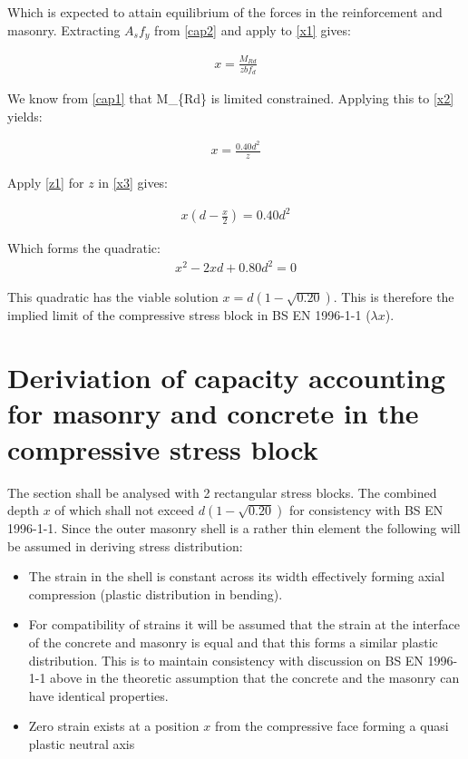 \documentclass[11pt]{article}
\providecommand{\tightlist}{%
      \setlength{\itemsep}{0pt}\setlength{\parskip}{0pt}}
\begin{document}
Which is expected to attain equilibrium of the forces in the
reinforcement and masonry. Extracting \(A_s f_y\) from \ref{cap2} and
apply to \ref{x1} gives:

\begin{align}
   x = \frac{M_{Rd}}{z b f_d}
   \end{align}

We know from \ref{cap1} that M\_\{Rd\} is limited constrained. Applying
this to \ref{x2} yields:

\begin{align}
x = \frac{0.40 d^2}{z}
\end{align}

Apply \ref{z1} for \(z\) in \ref{x3} gives:

\begin{align}
x(d - \frac{x}{2}) = 0.40d^2
\end{align}

Which forms the quadratic: \begin{align}
x^2 - 2 x d + 0.80 d^2 = 0
\end{align}

This quadratic has the viable solution \(x = d(1-\sqrt{0.20})\). This is
therefore the implied limit of the compressive stress block in BS EN
1996-1-1 (\(\lambda x\)).

    \hypertarget{deriviation-of-capacity-accounting-for-masonry-and-concrete-in-the-compressive-stress-block}{%
\section{Deriviation of capacity accounting for masonry and concrete in
the compressive stress
block}\label{deriviation-of-capacity-accounting-for-masonry-and-concrete-in-the-compressive-stress-block}}

The section shall be analysed with 2 rectangular stress blocks. The
combined depth \(x\) of which shall not exceed \(d(1-\sqrt{0.20})\) for
consistency with BS EN 1996-1-1. Since the outer masonry shell is a
rather thin element the following will be assumed in deriving stress
distribution:

\begin{itemize}
\tightlist
\item
  The strain in the shell is constant across its width effectively
  forming axial compression (plastic distribution in bending).
\item
  For compatibility of strains it will be assumed that the strain at the
  interface of the concrete and masonry is equal and that this forms a
  similar plastic distribution. This is to maintain consistency with
  discussion on BS EN 1996-1-1 above in the theoretic assumption that
  the concrete and the masonry can have identical properties.
\item
  Zero strain exists at a position \(x\) from the compressive face
  forming a quasi plastic neutral axis
\end{itemize}
\end{document}
